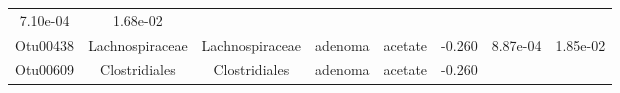 \documentclass[11pt,]{article}
\begin{document}
\begin{longtable}[]{@{}cccccccc@{}}
\begin{minipage}[t]{0.08\columnwidth}
7.10e-04\strut
\end{minipage} & \begin{minipage}[t]{0.08\columnwidth}\centering\strut
1.68e-02\strut
\end{minipage}\tabularnewline
\begin{minipage}[t]{0.08\columnwidth}\centering\strut
Otu00438\strut
\end{minipage} & \begin{minipage}[t]{0.15\columnwidth}\centering\strut
Lachnospiraceae\strut
\end{minipage} & \begin{minipage}[t]{0.15\columnwidth}\centering\strut
Lachnospiraceae\strut
\end{minipage} & \begin{minipage}[t]{0.08\columnwidth}\centering\strut
adenoma\strut
\end{minipage} & \begin{minipage}[t]{0.09\columnwidth}\centering\strut
acetate\strut
\end{minipage} & \begin{minipage}[t]{0.07\columnwidth}\centering\strut
-0.260\strut
\end{minipage} & \begin{minipage}[t]{0.08\columnwidth}\centering\strut
8.87e-04\strut
\end{minipage} & \begin{minipage}[t]{0.08\columnwidth}\centering\strut
1.85e-02\strut
\end{minipage}\tabularnewline
\begin{minipage}[t]{0.08\columnwidth}\centering\strut
Otu00609\strut
\end{minipage} & \begin{minipage}[t]{0.15\columnwidth}\centering\strut
Clostridiales\strut
\end{minipage} & \begin{minipage}[t]{0.15\columnwidth}\centering\strut
Clostridiales\strut
\end{minipage} & \begin{minipage}[t]{0.08\columnwidth}\centering\strut
adenoma\strut
\end{minipage} & \begin{minipage}[t]{0.09\columnwidth}\centering\strut
acetate\strut
\end{minipage} & \begin{minipage}[t]{0.07\columnwidth}\centering\strut
-0.260\strut
\end{minipage} & \begin{minipage}[t]{0.08\columnwidth}\centering\strut

\end{minipage}
\end{longtable}
\end{document}
